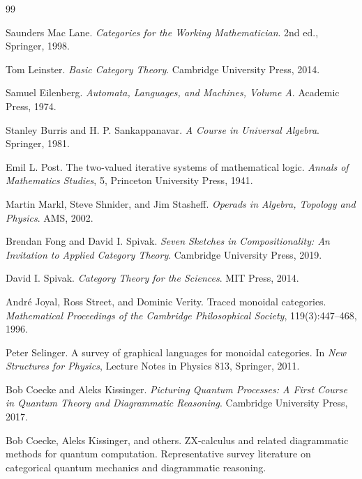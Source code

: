 \documentclass[11pt]{article}
\begin{document}
\begin{thebibliography}{99}

Saunders Mac Lane.
\newblock \emph{Categories for the Working Mathematician}.
\newblock 2nd ed., Springer, 1998.

Tom Leinster.
\newblock \emph{Basic Category Theory}.
\newblock Cambridge University Press, 2014.

Samuel Eilenberg.
\newblock \emph{Automata, Languages, and Machines, Volume A}.
\newblock Academic Press, 1974.

Stanley Burris and H. P. Sankappanavar.
\newblock \emph{A Course in Universal Algebra}.
\newblock Springer, 1981.

Emil L. Post.
\newblock The two-valued iterative systems of mathematical logic.
\newblock \emph{Annals of Mathematics Studies}, 5, Princeton University Press, 1941.

Martin Markl, Steve Shnider, and Jim Stasheff.
\newblock \emph{Operads in Algebra, Topology and Physics}.
\newblock AMS, 2002.

Brendan Fong and David I. Spivak.
\newblock \emph{Seven Sketches in Compositionality: An Invitation to Applied Category Theory}.
\newblock Cambridge University Press, 2019.

David I. Spivak.
\newblock \emph{Category Theory for the Sciences}.
\newblock MIT Press, 2014.

Andr\'e Joyal, Ross Street, and Dominic Verity.
\newblock Traced monoidal categories.
\newblock \emph{Mathematical Proceedings of the Cambridge Philosophical Society}, 119(3):447--468, 1996.

Peter Selinger.
\newblock A survey of graphical languages for monoidal categories.
\newblock In \emph{New Structures for Physics}, Lecture Notes in Physics 813, Springer, 2011.

Bob Coecke and Aleks Kissinger.
\newblock \emph{Picturing Quantum Processes: A First Course in Quantum Theory and Diagrammatic Reasoning}.
\newblock Cambridge University Press, 2017.

Bob Coecke, Aleks Kissinger, and others.
\newblock ZX-calculus and related diagrammatic methods for quantum computation.
\newblock Representative survey literature on categorical quantum mechanics and diagrammatic reasoning.


\end{thebibliography}
\end{document}
